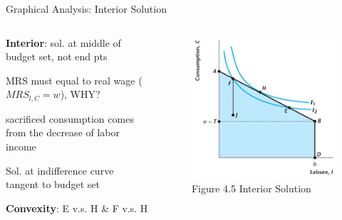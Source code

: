 \documentclass[11pt,aspectratio=169,usenames,dvipsnames]{beamer}
\let\tempone\itemize
\let\temptwo\enditemize
\renewenvironment{itemize}{\tempone\addtolength{\itemsep}{\fill}}{\temptwo}
\begin{document}
\begin{frame}{Graphical Analysis: Interior Solution}
\label{slide:Graphical_Analysis__Interior_Solution}
    \begin{columns}
        \begin{column}{0.5\textwidth}
            \begin{itemize}
                \item \textbf{Interior}: sol. at middle of budget set, not end pts
                \item \alert{MRS} must equal to \alert{real wage} ($MRS_{l, C} = w$), WHY?
                \begin{itemize}
                    \item sacrificed consumption comes from the decrease of labor income
                \end{itemize}
                \item Sol. at indifference curve \alert{tangent} to budget set
                \item \textbf{Convexity}: E v.s. H \& F v.s. H
            \end{itemize}
        \end{column}
        \begin{column}{0.5\textwidth}
            \begin{figure}
                \caption{Figure 4.5 Interior Solution}
                \includegraphics[width=.8\textwidth]{./figures/Figure4_5.jpg}
            \end{figure}
        \end{column}
    \end{columns}
\end{frame}
\end{document}
